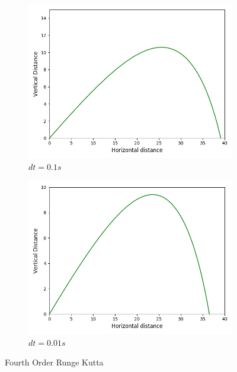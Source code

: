 \documentclass[12pt]{article}
\begin{document}
\begin{figure}[h]
	\centering
	\begin{subfigure}[h]{0.30\textwidth}
		\centering
		\includegraphics[width=\textwidth]{4orkdte-1.png}
		\caption{$dt = 0.1s$ }
	\end{subfigure}
	\begin{subfigure}[h]{0.300\textwidth}
		\centering
		\includegraphics[width=\textwidth]{4ork.png}
		\caption{$dt = 0.01s$}
	\end{subfigure}
	\caption{Fourth Order Runge Kutta}
\end{figure}
\end{document}
